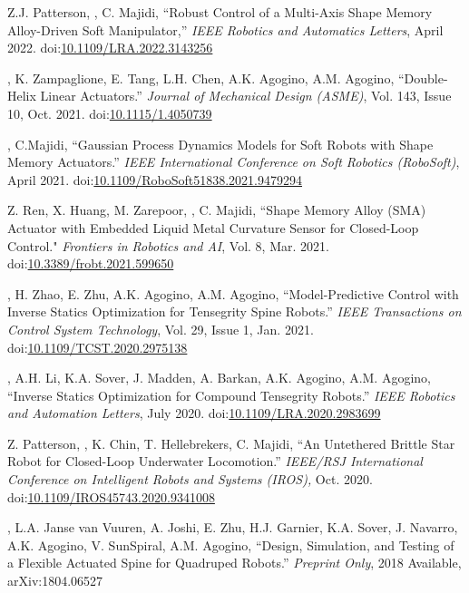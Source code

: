 \documentclass[letterpaper]{deedy-resume} %
\newcommand\doilink[1]{\href{http://dx.doi.org/#1}{#1}}
\newcommand\doi[1]{doi:\doilink{#1}}
\begin{document}
{\begin{etaremune}[itemsep=0.1cm]
\item Z.J. Patterson, \underline{{}}, C. Majidi, ``Robust Control of a Multi-Axis Shape Memory Alloy-Driven Soft Manipulator,'' {\it IEEE Robotics and Automatics Letters}, April 2022. \doi{10.1109/LRA.2022.3143256}

\item \underline{{}}, K. Zampaglione, E. Tang, L.H. Chen, A.K. Agogino, A.M. Agogino, ``Double-Helix Linear Actuators.'' {\it Journal of Mechanical Design (ASME)}, Vol. 143, Issue 10, Oct. 2021. \doi{10.1115/1.4050739}

\item \underline{{}}, C.Majidi, ``Gaussian Process Dynamics Models for Soft Robots with Shape Memory Actuators.'' {\it IEEE International Conference on Soft Robotics (RoboSoft)}, April 2021.  \doi{10.1109/RoboSoft51838.2021.9479294}

\item Z. Ren, X. Huang, M. Zarepoor, \underline{{}}, C. Majidi, ``Shape Memory Alloy (SMA) Actuator with Embedded Liquid Metal Curvature Sensor for Closed-Loop Control." {\it Frontiers in Robotics and AI}, Vol. 8, Mar. 2021. \doi{10.3389/frobt.2021.599650}

\item \underline{{}}, H. Zhao, E. Zhu, A.K. Agogino, A.M. Agogino, ``Model-Predictive Control with Inverse Statics Optimization for Tensegrity Spine Robots.'' {\it IEEE Transactions on Control System Technology}, Vol. 29, Issue 1, Jan. 2021. \doi{10.1109/TCST.2020.2975138}

\item \underline{{}}, A.H. Li, K.A. Sover, J. Madden, A. Barkan, A.K. Agogino, A.M. Agogino, ``Inverse Statics Optimization for Compound Tensegrity Robots.'' {\it IEEE Robotics and Automation Letters}, July 2020. \doi{10.1109/LRA.2020.2983699}

\item Z. Patterson, \underline{{}}, K. Chin, T. Hellebrekers, C. Majidi, ``An Untethered Brittle Star Robot for Closed-Loop Underwater Locomotion.'' {\it IEEE/RSJ International Conference on Intelligent Robots and Systems (IROS),} Oct. 2020. \doi{10.1109/IROS45743.2020.9341008}

\item \underline{{}}, L.A. Janse van Vuuren, A. Joshi, E. Zhu, H.J. Garnier, K.A. Sover, J. Navarro, A.K. Agogino, V. SunSpiral, A.M. Agogino, ``Design, Simulation, and Testing of a Flexible Actuated Spine for Quadruped Robots.'' {\it Preprint Only}, 2018 Available, arXiv:1804.06527 


\end{etaremune}}
\end{document}
